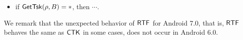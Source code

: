 {\begin{itemize}
\begin{itemize}
\begin{itemize}
\begin{itemize}
\begin{itemize}
                \begin{itemize}
                    \item if $\phi\models\stpflag$ and $A = B$, or $\phi \models\stpflag\wedge\pitflag$ and $\preact(\rho) = B$, then $\rho' = \rho$ and $b' = b$, 
                    \item otherwise, $b' = \nohflag$ iff $\phi \models \nohflag$, moreover, 
                    \begin{itemize}
                        \item if $b = \neg \nohflag$, then $\rho'=\push(\rho, B)$,
                        \item otherwise, $\rho' = \rmact(\push(\rho, B), 1, 2)$, 
                    \end{itemize}
            \end{itemize}
        \end{itemize}
    \end{itemize}
\end{itemize}
\item if $\mathsf{GetTsk}(\rho, B) = *$, then $\cdots$. 
\end{itemize}
\end{itemize}
}
%
We remark that the unexpected behavior of ${\sf RTF}$ for Android 7.0, that is, ${\sf RTF}$ behaves the same as ${\sf CTK}$ in some cases, does not occur in Android 6.0. 
